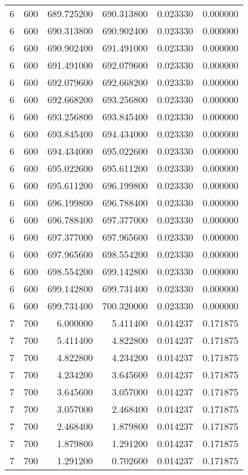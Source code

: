 \begin{longtable}{rrrrrr}
6 & 600 & 689.725200 & 690.313800 & 0.023330 & 0.000000 \\
6 & 600 & 690.313800 & 690.902400 & 0.023330 & 0.000000 \\
6 & 600 & 690.902400 & 691.491000 & 0.023330 & 0.000000 \\
6 & 600 & 691.491000 & 692.079600 & 0.023330 & 0.000000 \\
6 & 600 & 692.079600 & 692.668200 & 0.023330 & 0.000000 \\
6 & 600 & 692.668200 & 693.256800 & 0.023330 & 0.000000 \\
6 & 600 & 693.256800 & 693.845400 & 0.023330 & 0.000000 \\
6 & 600 & 693.845400 & 694.434000 & 0.023330 & 0.000000 \\
6 & 600 & 694.434000 & 695.022600 & 0.023330 & 0.000000 \\
6 & 600 & 695.022600 & 695.611200 & 0.023330 & 0.000000 \\
6 & 600 & 695.611200 & 696.199800 & 0.023330 & 0.000000 \\
6 & 600 & 696.199800 & 696.788400 & 0.023330 & 0.000000 \\
6 & 600 & 696.788400 & 697.377000 & 0.023330 & 0.000000 \\
6 & 600 & 697.377000 & 697.965600 & 0.023330 & 0.000000 \\
6 & 600 & 697.965600 & 698.554200 & 0.023330 & 0.000000 \\
6 & 600 & 698.554200 & 699.142800 & 0.023330 & 0.000000 \\
6 & 600 & 699.142800 & 699.731400 & 0.023330 & 0.000000 \\
6 & 600 & 699.731400 & 700.320000 & 0.023330 & 0.000000 \\
7 & 700 & 6.000000 & 5.411400 & 0.014237 & 0.171875 \\
7 & 700 & 5.411400 & 4.822800 & 0.014237 & 0.171875 \\
7 & 700 & 4.822800 & 4.234200 & 0.014237 & 0.171875 \\
7 & 700 & 4.234200 & 3.645600 & 0.014237 & 0.171875 \\
7 & 700 & 3.645600 & 3.057000 & 0.014237 & 0.171875 \\
7 & 700 & 3.057000 & 2.468400 & 0.014237 & 0.171875 \\
7 & 700 & 2.468400 & 1.879800 & 0.014237 & 0.171875 \\
7 & 700 & 1.879800 & 1.291200 & 0.014237 & 0.171875 \\
7 & 700 & 1.291200 & 0.702600 & 0.014237 & 0.171875 \\

\end{longtable}
